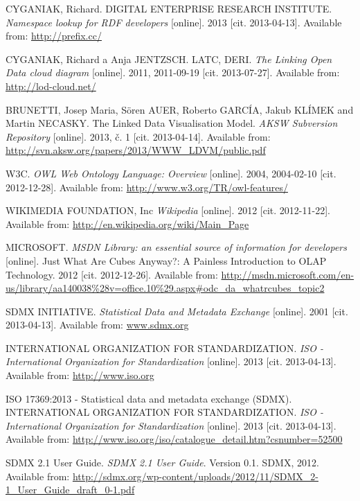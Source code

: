 \begin{thebibliography}{99}
  {\sc CYGANIAK,} Richard. DIGITAL ENTERPRISE RESEARCH INSTITUTE. 
  \emph{Namespace lookup for RDF developers}
  [online]. 2013 [cit. 2013-04-13]. Available from: \url{http://prefix.cc/}

{\sc CYGANIAK,} Richard a Anja JENTZSCH. LATC, DERI.
\emph{The Linking Open Data cloud diagram} [online]. 2011, 2011-09-19 [cit. 2013-07-27].
Available from: \url{http://lod-cloud.net/}

 {\sc BRUNETTI,} Josep Maria, Sören AUER, Roberto GARCÍA, Jakub KLÍMEK and Martin NECASKY.
 The Linked Data Visualisation Model.
 \emph{AKSW Subversion Repository} [online]. 2013, č. 1 [cit. 2013-04-14].
 Available from: \url{http://svn.aksw.org/papers/2013/WWW_LDVM/public.pdf}

{\sc W3C.}
\emph{OWL Web Ontology Language: Overview} [online]. 2004,
2004-02-10 [cit. 2012-12-28].
Available from: \url{http://www.w3.org/TR/owl-features/}

{\sc WIKIMEDIA FOUNDATION, Inc}
\emph{Wikipedia} [online]. 2012 [cit. 2012-11-22].
Available from:  \url{http://en.wikipedia.org/wiki/Main_Page}

{\sc MICROSOFT.}
\emph{MSDN Library: an essential source of information for developers} [online].
Just What Are Cubes Anyway?: A Painless Introduction to OLAP Technology.
2012 [cit. 2012-12-26].
Available from: \url{http://msdn.microsoft.com/en-us/library/aa140038%28v=office.10%29.aspx#odc\_da\_whatrcubes\_topic2}

  {\sc } SDMX INITIATIVE.
  \emph{Statistical Data and Metadata Exchange}
  [online]. 2001 [cit. 2013-04-13]. Available from: \url{www.sdmx.org}

 {\sc } INTERNATIONAL ORGANIZATION FOR STANDARDIZATION.
 \emph{ISO - International Organization for Standardization}
 [online]. 2013 [cit. 2013-04-13]. Available from: \url{http://www.iso.org}
 
 {\sc} ISO 17369:2013 - Statistical data and metadata exchange (SDMX).
 INTERNATIONAL ORGANIZATION FOR STANDARDIZATION.
 \emph{ISO - International Organization for Standardization} [online]. 2013 [cit. 2013-04-13].
 Available from: \url{http://www.iso.org/iso/catalogue_detail.htm?csnumber=52500}
 
 {\sc } SDMX 2.1 User Guide.
 \emph{SDMX 2.1 User Guide}.
 Version 0.1. SDMX, 2012.
 Available from: \url{http://sdmx.org/wp-content/uploads/2012/11/SDMX_2-1_User_Guide_draft_0-1.pdf}


\end{thebibliography}
